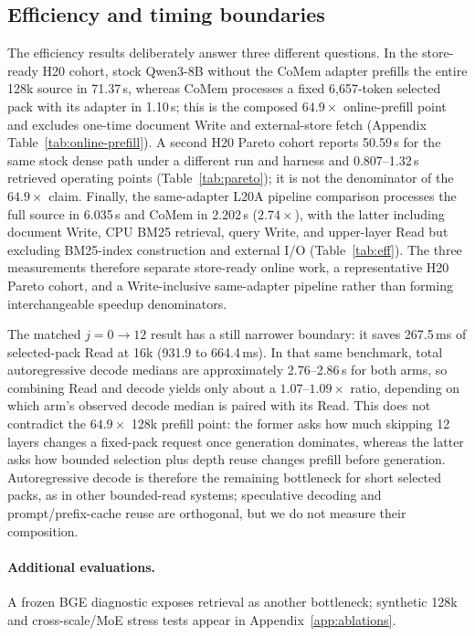 \subsection{Efficiency and timing boundaries}
The efficiency results deliberately answer three different questions. In the
store-ready H20 cohort, stock Qwen3-8B without the CoMem adapter prefills the
entire 128k source in 71.37\,s, whereas CoMem processes a fixed 6,657-token
selected pack with its adapter in 1.10\,s; this is the composed
$64.9\times$ online-prefill point and excludes one-time document Write and
external-store fetch (Appendix Table~\ref{tab:online-prefill}). A second H20
Pareto cohort reports 50.59\,s for the same stock dense path under a different
run and harness and 0.807--1.32\,s retrieved operating points
(Table~\ref{tab:pareto}); it is not the denominator of the $64.9\times$ claim.
Finally, the same-adapter L20A pipeline comparison processes the full source in
6.035\,s and CoMem in 2.202\,s ($2.74\times$), with the latter including
document Write, CPU BM25 retrieval, query Write, and upper-layer Read but
excluding BM25-index construction and external I/O (Table~\ref{tab:eff}). The
three measurements therefore separate store-ready online work, a representative
H20 Pareto cohort, and a Write-inclusive same-adapter pipeline rather than
forming interchangeable speedup denominators.

The matched $j{=}0\!\rightarrow\!12$ result has a still narrower boundary: it
saves 267.5\,ms of selected-pack Read at 16k (931.9 to 664.4\,ms). In that
same benchmark, total autoregressive decode medians are approximately
2.76--2.86\,s for both arms, so combining Read and decode yields only about a
$1.07$--$1.09\times$ ratio, depending on which arm's observed decode median is
paired with its Read. This does not contradict the $64.9\times$ 128k prefill
point: the former asks how much skipping 12 layers changes a fixed-pack
request once generation dominates, whereas the latter asks how bounded
selection plus depth reuse changes prefill before generation. Autoregressive
decode is therefore the remaining bottleneck for short selected packs, as in
other bounded-read systems; speculative decoding and prompt/prefix-cache reuse
are orthogonal, but we do not measure their composition.

\paragraph{Additional evaluations.}
A frozen BGE diagnostic exposes retrieval as another bottleneck; synthetic
128k and cross-scale/MoE stress tests appear in Appendix~\ref{app:ablations}.
